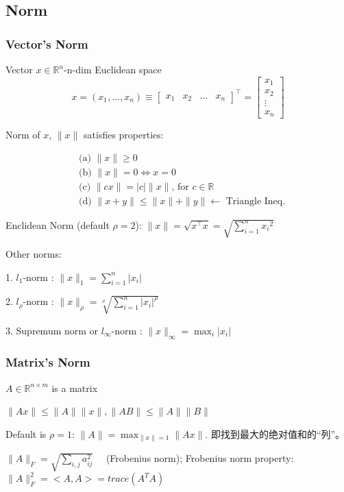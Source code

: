 \documentclass[11pt,a4paper]{article}
\begin{document}
\subsection{Norm}
\subsubsection{Vector's Norm}
Vector $x \in \mathbb{R}^{n}$-n-dim Euclidean space
$$
x=\left(x_{1}, \ldots, x_{n}\right) \equiv\left[\begin{array}{llll}
x_{1} & x_{2} & \ldots & x_{n}
\end{array}\right]^{\top}=\left[\begin{array}{c}
x_{1} \\
x_{2} \\
\vdots \\
x_{n}
\end{array}\right]
$$

Norm of $x$, $\|x\|$ satisfies properties:

$$
\begin{aligned}
&\text { (a) }\|x\| \geqslant 0 \\
&\text { (b) }\|x\|=0 \Leftrightarrow x=0 \\
&\text { (c) }\|c x\|=|c|\|x\| \text {, for } c \in \mathbb{R} \\
&\text { (d) }\|x+y\| \leqslant\|x\|+\|y\| \longleftarrow \text { Triangle Ineq. }
\end{aligned}
$$

Enclidean Norm (default $\rho=2$): $\|x\|=\sqrt{x^{\top} x}=\sqrt{\sum_{i=1}^{n} x_{i}{ }^{2}}$

Other norms:

1. $l_{1}$-norm : $\|x\|_{1}=\sum_{i=1}^{n}\left|x_{i}\right|$

2. $l_{\rho}$-norm : $\|x\|_{\rho}=\sqrt[\rho]{\sum_{i=1}^{n}\left|x_{i}\right|^\rho}$

3. Supremum norm or $l_{\infty}$-norm : $\|x\|_{\infty}=\max _{i}\left|x_{i}\right|$

\subsubsection{Matrix's Norm}
$A\in \mathbb{R}^{n\times m}$ is a matrix

$\|A x\| \leqslant\|A\|\|x\|,\|A B\| \leqslant\|A\|\|B\|$

Default is $\rho=1$: $\|A\|=\max _{\|x\|=1}\|A x\|$. 即找到最大的绝对值和的“列”。

$\|A\|_{F}=\sqrt{\sum_{i, j} a_{i j}^{2}} \quad$ (Frobenius norm);  Frobenius norm property: $\|A\|_F^2=<A,A>=trace(A^TA)$
\end{document}
